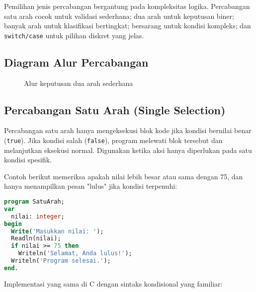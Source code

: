 \documentclass[../main.tex]{subfiles}
\begin{document}
Pemilihan jenis percabangan bergantung pada kompleksitas logika. Percabangan satu arah cocok untuk validasi sederhana; dua arah untuk keputusan biner; banyak arah untuk klasifikasi bertingkat; bersarang untuk kondisi kompleks; dan \texttt{switch/case} untuk pilihan diskret yang jelas.

\subsection{Diagram Alur Percabangan}
\begin{figure}[H]
  \centering
  \caption{Alur keputusan dua arah sederhana}
\end{figure}

\subsection{Percabangan Satu Arah (Single Selection)}
Percabangan satu arah hanya mengeksekusi blok kode jika kondisi bernilai benar (\texttt{true}). Jika kondisi salah (\texttt{false}), program melewati blok tersebut dan melanjutkan eksekusi normal. Digunakan ketika aksi hanya diperlukan pada satu kondisi spesifik.

Contoh berikut memeriksa apakah nilai lebih besar atau sama dengan 75, dan hanya menampilkan pesan "lulus" jika kondisi terpenuhi:

\begin{lstlisting}[language=Pascal, caption={Percabangan satu arah di Pascal}]
program SatuArah;
var
  nilai: integer;
begin
  Write('Masukkan nilai: ');
  Readln(nilai);
  if nilai >= 75 then
    Writeln('Selamat, Anda lulus!');
  Writeln('Program selesai.');
end.
\end{lstlisting}

Implementasi yang sama di C dengan sintaks kondisional yang familiar:
\end{document}

